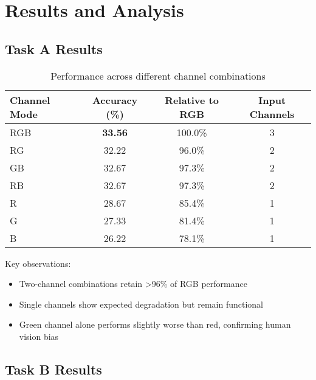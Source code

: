 \documentclass[11pt,a4paper]{article}
\begin{document}
\section{Results and Analysis}

\subsection{Task A Results}

\begin{table}[h]
\centering
\caption{Performance across different channel combinations}
\begin{tabular}{lccc}
\toprule
\textbf{Channel Mode} & \textbf{Accuracy (\%)} & \textbf{Relative to RGB} & \textbf{Input Channels} \\
\midrule
RGB & \textbf{33.56} & 100.0\% & 3 \\
RG & 32.22 & 96.0\% & 2 \\
GB & 32.67 & 97.3\% & 2 \\
RB & 32.67 & 97.3\% & 2 \\
R & 28.67 & 85.4\% & 1 \\
G & 27.33 & 81.4\% & 1 \\
B & 26.22 & 78.1\% & 1 \\
\bottomrule
\end{tabular}
\end{table}

Key observations:
\begin{itemize}
    \item Two-channel combinations retain >96\% of RGB performance
    \item Single channels show expected degradation but remain functional
    \item Green channel alone performs slightly worse than red, confirming human vision bias
\end{itemize}

\subsection{Task B Results}
\end{document}
